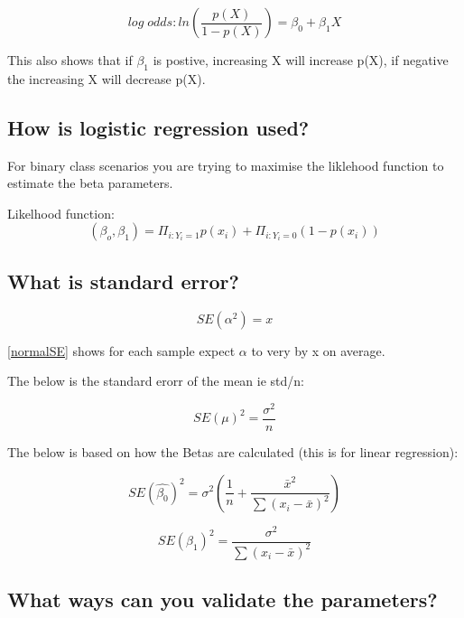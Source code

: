 \documentclass[11pt]{scrartcl} %
\begin{document}
\begin{equation}
	log\; odds: ln(\frac{p(X)}{1-p(X)}) = \beta_0 + \beta_1X
\end{equation}

This also shows that if \(\beta_1\) is postive, increasing X will increase p(X), if negative the increasing X will
decrease p(X).

\subsection{How is logistic regression used?}

For binary class scenarios you are trying to maximise the liklehood function to estimate the beta parameters.

Likelhood function:
\begin{equation}
	(\beta_o,\beta_1) = \Pi_{i:Y_i=1}p(x_i) + \Pi_{i:Y_i=0}(1-p(x_i))
\end{equation}

\subsection{What is standard error?}

\begin{equation}
	SE(\alpha^2) = x
	\label{normalSE}
\end{equation}

\ref{normalSE} shows for each sample expect \(\alpha\) to very by x on average.

The below is the standard erorr of the mean ie std/n:

\begin{equation}
	SE(\mu)^2 = \frac{\sigma^2}{n}
\end{equation}

The below is based on how the Betas are calculated (this is for linear regression):

\begin{equation}
	SE(\hat{\beta_0})^2 = \sigma^2(\frac{1}{n} + \frac{\bar{x}^2}{\sum{(x_i-\bar{x})^2}})
\end{equation}

\begin{equation}
	SE(\beta_1)^2 = \frac{\sigma^2}{\sum{(x_i-\bar{x})^2}}
\end{equation}



\subsection{What ways can you validate the parameters?}
\end{document}
